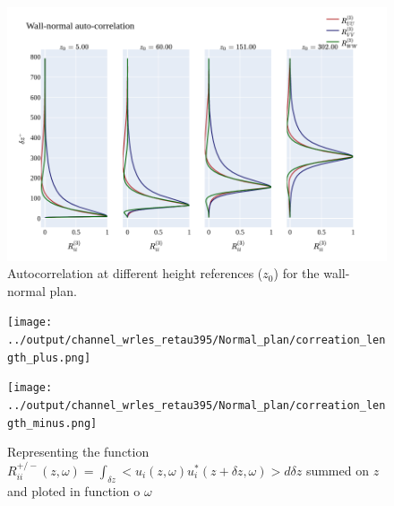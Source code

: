 \documentclass[]{article}
\theoremstyle{plain}
\theoremstyle{remark}
\begin{document}
\begin{figure}[h!]
	\begin{center}
		\includegraphics[width=\textwidth]{../output/channel_wrles_retau395/Normal_plan/autocorreation_z.png}
		\caption{Autocorrelation at different height references ($z_0$) for the wall-normal plan.}
	\end{center}
\end{figure}

\begin{figure}[h!]
	\begin{center}
		\texttt{[image: ../output/channel\_wrles\_retau395/Normal\_plan/correation\_length\_plus.png]}
	\end{center}
\end{figure}

\begin{figure}[h!]
	\begin{center}
		\texttt{[image: ../output/channel\_wrles\_retau395/Normal\_plan/correation\_length\_minus.png]}
		\caption{Representing the function $R_{ii}^{+/-}(z,\omega)=\int_{\delta z}<u_i(z,\omega)u_i^*(z+\delta z, \omega)>d\delta z$ summed on $z$ and ploted in function o $\omega$}
	\end{center}
\end{figure}
	
	
\end{document}
